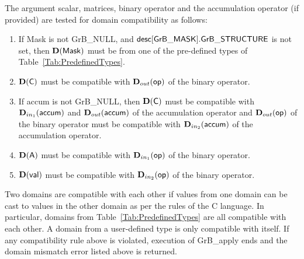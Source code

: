 The argument scalar, matrices, binary operator and the accumulation 
operator (if provided) are tested for domain compatibility as follows:
\begin{enumerate}
	\item If {\sf Mask} is not {\sf GrB\_NULL}, and ${\sf desc[GrB\_MASK].GrB\_STRUCTURE}$
    is not set, then $\bold{D}({\sf Mask})$ must be from one of the pre-defined types of 
    Table~\ref{Tab:PredefinedTypes}.

	\item $\bold{D}({\sf C})$ must be
    compatible with $\mbox{$\mathbf{D}_{out}$}({\sf op})$ of the binary operator. 

	\item If {\sf accum} is not {\sf GrB\_NULL}, then $\bold{D}({\sf C})$ must be
    compatible with $\mbox{$\mathbf{D}_{in_{1}}$}({\sf accum})$ and $\mbox{$\mathbf{D}_{out}$}({\sf accum})$ of the accumulation operator and 
    $\mbox{$\mathbf{D}_{out}$}({\sf op})$ of the binary operator must be compatible with $\mbox{$\mathbf{D}_{in_{2}}$}({\sf accum})$ of the accumulation operator.

	\item $\bold{D}({\sf A})$ must be compatible with $\mbox{$\mathbf{D}_{in_{1}}$}({\sf op})$ of the binary operator.
    
	\item $\bold{D}({\sf val})$ must be compatible with $\mbox{$\mathbf{D}_{in_{2}}$}({\sf op})$ of the binary operator.
\end{enumerate}
Two domains are compatible with each other if values from one domain can be cast 
to values in the other domain as per the rules of the C language.
In particular, domains from Table~\ref{Tab:PredefinedTypes} are all compatible 
with each other. A domain from a user-defined type is only compatible with itself.
If any compatibility rule above is violated, execution of {\sf GrB\_apply} ends and 
the domain mismatch error listed above is returned.

